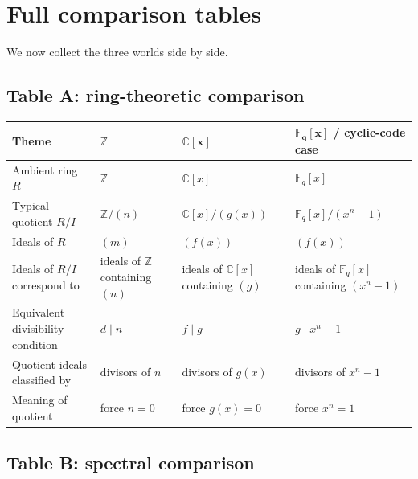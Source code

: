 \documentclass[11pt]{article}
\theoremstyle{definition}
\newcommand{\Z}{\mathbb{Z}}
\newcommand{\C}{\mathbb{C}}
\newcommand{\F}{\mathbb{F}}
\begin{document}
	\section{Full comparison tables}
	
	We now collect the three worlds side by side.
	
	\subsection*{Table A: ring-theoretic comparison}
	
	\begin{longtable}{@{}p{}p{}p{}p{}@{}}
		\toprule
		\textbf{Theme} & \(\boldsymbol{\Z}\) & \(\boldsymbol{\C[x]}\) & \(\boldsymbol{\F_q[x]}\) / cyclic-code case \\ \midrule
		Ambient ring \(R\) & \(\Z\) & \(\C[x]\) & \(\F_q[x]\) \\
		Typical quotient \(R/I\) & \(\Z/(n)\) & \(\C[x]/(g(x))\) & \(\F_q[x]/(x^n-1)\) \\
		Ideals of \(R\) & \((m)\) & \((f(x))\) & \((f(x))\) \\
		Ideals of \(R/I\) correspond to & ideals of \(\Z\) containing \((n)\) & ideals of \(\C[x]\) containing \((g)\) & ideals of \(\F_q[x]\) containing \((x^n-1)\) \\
		Equivalent divisibility condition & \(d\mid n\) & \(f\mid g\) & \(g\mid x^n-1\) \\
		Quotient ideals classified by & divisors of \(n\) & divisors of \(g(x)\) & divisors of \(x^n-1\) \\
		Meaning of quotient & force \(n=0\) & force \(g(x)=0\) & force \(x^n=1\) \\
		\bottomrule
	\end{longtable}
	
	\subsection*{Table B: spectral comparison}
	
\end{document}
